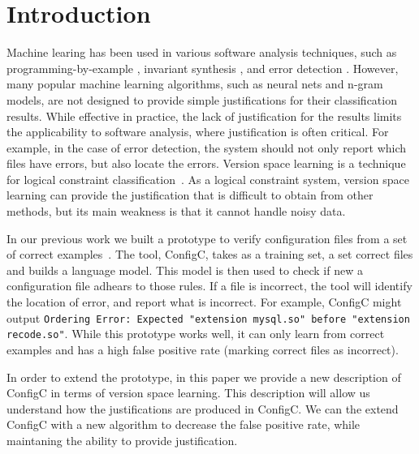 \section{Introduction}

Machine learing has been used in various software analysis techniques, such as programming-by-example \cite{lau2000version}, invariant synthesis \cite{garg2014ice}, and error detection \cite{Santolucito2016}.
However, many popular machine learning algorithms, such as neural nets and n-gram models, are not designed to provide simple justifications for their classification results.
While effective in practice, the lack of justification for the results limits the applicability to software analysis, where justification is often critical.
For example, in the case of error detection, the system should not only report which files have errors, but also locate the errors.
Version space learning is a technique for logical constraint classification~\cite{mitchell82}.
As a logical constraint system, version space learning can provide the justification that is difficult to obtain from other methods, but its main weakness is that it cannot handle noisy data.


In our previous work we built a prototype to verify configuration files from a set of correct examples~\cite{Santolucito2016}.
The tool, ConfigC, takes as a training set, a set correct files and builds a language model.
This model is then used to check if new a configuration file adhears to those rules.
If a file is incorrect, the tool will identify the location of error, and report what is incorrect.
For example, ConfigC might output \texttt{Ordering Error: Expected "extension mysql.so" before "extension recode.so"}.
While this prototype works well, it can only learn from correct examples and has a high false positive rate (marking correct files as incorrect).

In order to extend the prototype, in this paper we provide a new description of ConfigC in terms of version space learning.
This description will allow us understand how the justifications are produced in ConfigC.
We can the extend ConfigC with a new algorithm to decrease the false positive rate, while maintaning the ability to provide justification.

